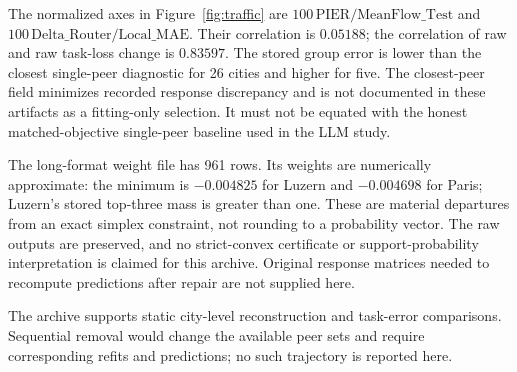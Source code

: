 The normalized axes in Figure~\ref{fig:traffic} are $100\,\mathrm{PIER}/\mathrm{MeanFlow\_Test}$ and $100\,\mathrm{Delta\_Router}/\mathrm{Local\_MAE}$. Their correlation is $0.05188$; the correlation of raw \PIER and raw task-loss change is $0.83597$. The stored group error is lower than the closest single-peer diagnostic for 26 cities and higher for five. The closest-peer field minimizes recorded response discrepancy and is not documented in these artifacts as a fitting-only selection. It must not be equated with the honest matched-objective single-peer baseline used in the LLM study.

The long-format weight file has 961 rows. Its weights are numerically approximate: the minimum is $-0.004825$ for Luzern and $-0.004698$ for Paris; Luzern's stored top-three mass is greater than one. These are material departures from an exact simplex constraint, not rounding to a probability vector. The raw outputs are preserved, and no strict-convex certificate or support-probability interpretation is claimed for this archive. Original response matrices needed to recompute predictions after repair are not supplied here.

The archive supports static city-level reconstruction and task-error comparisons. Sequential removal would change the available peer sets and require corresponding refits and predictions; no such trajectory is reported here.


